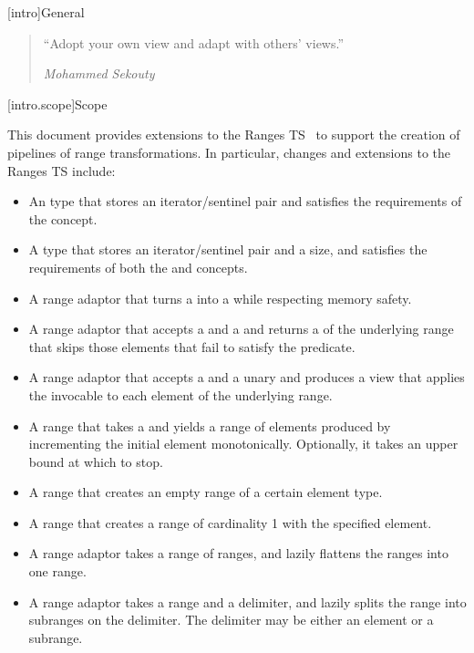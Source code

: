 [intro]{General}

\begin{quote}
``Adopt your own view and adapt with others' views.''
\begin{flushright}
\textemdash \textit{Mohammed Sekouty}
\end{flushright}
\end{quote}

[intro.scope]{Scope}


\pnum
This document provides extensions to the Ranges TS~\cite{ranges-ts} to
support the creation of pipelines of range transformations. In particular,
changes and extensions to the Ranges TS include:

\begin{itemize}
\item An  type that stores an iterator/sentinel pair and
satisfies the requirements of the  concept.
\item A  type that stores an iterator/sentinel pair
and a size, and satisfies the requirements of both the  and
 concepts.
\item A  range adaptor that turns a  into a
 while respecting memory safety.
\item A  range adaptor that accepts a  and a
 and returns a  of the underlying range that skips
those elements that fail to satisfy the predicate.
\item A  range adaptor that accepts a  and a
unary  and produces a view that applies the invocable to each
element of the underlying range.
\item A  range that takes a  and
yields a range of elements produced by incrementing the initial element
monotonically. Optionally, it takes an upper bound at which to stop.
\item A  range that creates an empty range of a certain
element type.
\item A  range that creates a range of cardinality 1 with
the specified element.
\item A  range adaptor takes a range of ranges,
and lazily flattens the ranges into one range.
\item A  range adaptor takes a range and a delimiter,
and lazily splits the range into subranges on the delimiter. The delimiter may
be either an element or a subrange.
\end{itemize}

